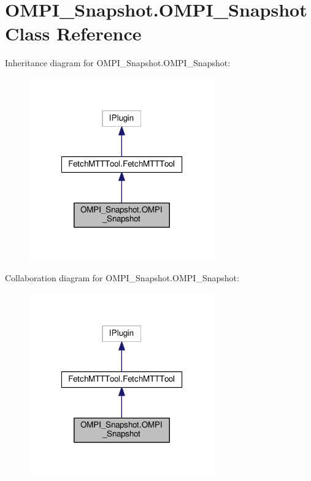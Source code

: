 \hypertarget{classOMPI__Snapshot_1_1OMPI__Snapshot}{\section{O\-M\-P\-I\-\_\-\-Snapshot.\-O\-M\-P\-I\-\_\-\-Snapshot Class Reference}
\label{classOMPI__Snapshot_1_1OMPI__Snapshot}
}


Inheritance diagram for O\-M\-P\-I\-\_\-\-Snapshot.\-O\-M\-P\-I\-\_\-\-Snapshot\-:
\nopagebreak
\begin{figure}[H]
\begin{center}
\leavevmode
\includegraphics[width=226pt]{classOMPI__Snapshot_1_1OMPI__Snapshot__inherit__graph}
\end{center}
\end{figure}


Collaboration diagram for O\-M\-P\-I\-\_\-\-Snapshot.\-O\-M\-P\-I\-\_\-\-Snapshot\-:
\nopagebreak
\begin{figure}[H]
\begin{center}
\leavevmode
\includegraphics[width=226pt]{classOMPI__Snapshot_1_1OMPI__Snapshot__coll__graph}
\end{center}
\end{figure}
